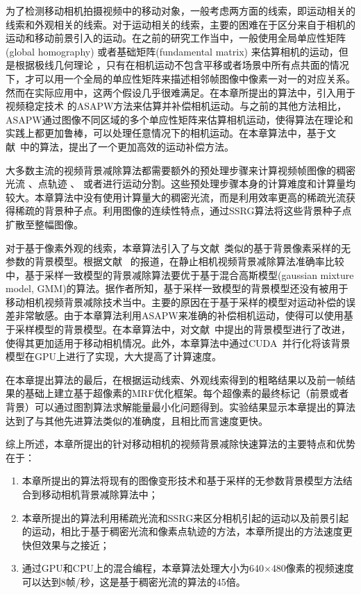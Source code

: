 为了检测移动相机拍摄视频中的移动对象，一般考虑两方面的线索，即运动相关的线索和外观相关的线索。对于运动相关的线索，主要的困难在于区分来自于相机的运动和移动前景引入的运动。在之前的研究工作当中，一般使用全局单应性矩阵(global homography)\cite{5.8s,LiuCVPR09} 或者基础矩阵(fundamental matrix) \cite{kwak2011Generalized,LimPRFloating}来估算相机的运动，但是根据极线几何理论 \cite{Multitransform}，只有在相机运动不包含平移或者场景中所有点共面的情况下，才可以用一个全局的单应性矩阵来描述相邻帧图像中像素一对一的对应关系。然而在实际应用中，这两个假设几乎很难满足。在本章所提出的算法中，引入用于视频稳定技术\cite{Liu2009ASAP,Liu_2013ASAP} 的ASAPW方法来估算并补偿相机运动。与之前的其他方法相比，ASAPW通过图像不同区域的多个单应性矩阵来估算相机运动，使得算法在理论和实践上都更加鲁棒，可以处理任意情况下的相机运动。在本章算法中，基于文献~中的算法，提出了一个更加高效的运动补偿方法。\par

大多数主流的视频背景减除算法都需要额外的预处理步骤来计算视频帧图像的稠密光流 \cite{Multitransform,gbsuperpixel}、点轨迹 \cite{iccv2009,Cui2012,SubspaceTracking}、 或者进行运动分割\cite{kwak2011Generalized}。这些预处理步骤本身的计算难度和计算量均较大。本章算法中没有使用计算量大的稠密光流，而是利用效率更高的稀疏光流获得稀疏的背景种子点。利用图像的连续性特点，通过SSRG算法将这些背景种子点扩散至整幅图像。\par

对于基于像素外观的线索，本章算法引入了与文献~类似的基于背景像素采样的无参数的背景模型。根据文献
 ~的报道，在静止相机视频背景减除算法准确率比较中，基于采样一致模型的背景减除算法要优于基于混合高斯模型(gaussian mixture model, GMM)的算法。据作者所知，基于采样一致模型的背景模型还没有被用于移动相机视频背景减除技术当中。主要的原因在于基于采样的模型对运动补偿的误差非常敏感。由于本章算法利用ASAPW来准确的补偿相机运动，使得可以使用基于采样模型的背景模型。在本章算法中，对文献~中提出的背景模型进行了改进，使得其更加适用于移动相机情况。此外，本章算法中通过CUDA~\cite{CUDA}并行化将该背景模型在GPU上进行了实现，大大提高了计算速度。\par

 在本章提出算法的最后，在根据运动线索、外观线索得到的粗略结果以及前一帧结果的基础上建立基于超像素的MRF优化框架。每个超像素的最终标记（前景或者背景）可以通过图割算法\cite{graphcut04}求解能量最小化问题得到。实验结果显示本章提出的算法达到了与其他先进算法类似的准确度，且相比而言速度更快。


综上所述，本章所提出的针对移动相机的视频背景减除快速算法的主要特点和优势在于：
\begin{enumerate}
\item 本章所提出的算法将现有的图像变形技术和基于采样的无参数背景模型方法结合到移动相机背景减除算法中；
\item 本章所提出的算法利用稀疏光流和SSRG来区分相机引起的运动以及前景引起的运动，相比于基于稠密光流和像素点轨迹的方法，本章所提出的方法速度更快但效果与之接近；
\item 通过GPU和CPU上的混合编程，本章算法处理大小为640$\times$480像素的视频速度可以达到8帧/秒，这是基于稠密光流的算法\cite{gbsuperpixel}的45倍。
\end{enumerate}


